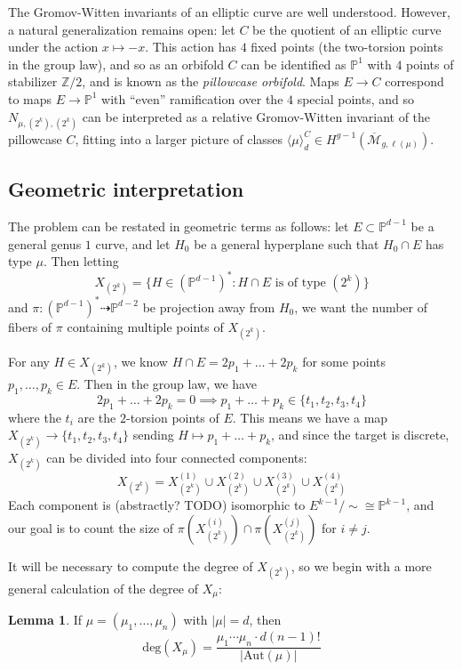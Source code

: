 \documentclass[11pt]{article}           %
\newcommand{\Z}{\ensuremath{\mathbb{Z}}}
\renewcommand{\P}{\mathbb P}
\theoremstyle{definition}
\newtheorem{lem}{Lemma}[section]
\begin{document}
The Gromov-Witten invariants of an elliptic curve are well understood. However, a natural generalization
remains open: let $C$ be the quotient of an elliptic curve under the action $x\mapsto -x$.
This action has $4$ fixed points (the two-torsion points in the group law), and so as an orbifold
$C$ can be identified as $\P^1$ with $4$ points of stabilizer $\Z/2$, and is known as the
{\it pillowcase orbifold}. Maps $E\to C$ correspond to maps $E\to\P^1$ with ``even'' ramification over
the $4$ special points, and so $N_{\mu,(2^k),(2^k)}$ can be interpreted as a relative Gromov-Witten
invariant of the pillowcase $C$, fitting into a larger picture of classes $\langle \mu\rangle_d^{C}\in H^{g-1}(\overline{\mathcal M}_{g,\ell(\mu)})$.

\subsection{Geometric interpretation}

The problem can be restated in geometric terms as follows: let $E\subset \P^{d-1}$ be a general genus $1$ curve,
and let $H_0$ be a general hyperplane such that $H_0\cap E$ has type $\mu$. Then letting \[X_{(2^k)}=\{H\in(\P^{d-1})^*:H\cap E\text{ is of type }(2^k)\}\]
and $\pi:(\P^{d-1})^*\dashrightarrow \P^{d-2}$ be projection away from $H_0$, we want the number of fibers of $\pi$
containing multiple points of $X_{(2^k)}$.

For any $H\in X_{(2^k)}$, we know $H\cap E=2p_1+\dots+2p_k$ for some points $p_1,\dots,p_k\in E$. Then in the group law, we have
\[
2p_1+\dots+2p_k=0\implies p_1+\dots+p_k\in\{t_1,t_2,t_3,t_4\}
\]
where the $t_i$ are the $2$-torsion points of $E$. This means we have a map $X_{(2^k)}\to\{t_1,t_2,t_3,t_4\}$ sending $H\mapsto p_1+\dots+p_k$, and since the target is discrete, $X_{(2^k)}$ can be divided into four connected components:
\[
X_{(2^k)}=X_{(2^k)}^{(1)}\cup X_{(2^k)}^{(2)}\cup X_{(2^k)}^{(3)}\cup X_{(2^k)}^{(4)}
\]
Each component is (abstractly? TODO) isomorphic to $E^{k-1}/\sim\cong \P^{k-1}$,
and our goal is to count the size of $\pi(X_{(2^k)}^{(i)})\cap \pi(X_{(2^k)}^{(j)})$
for $i\neq j$.

It will be necessary to compute the degree of $X_{(2^k)}$, so we begin with a more general calculation of the degree of $X_{\mu}$:

\begin{lem}
  If $\mu=(\mu_1,\dots,\mu_n)$ with $|\mu|=d$, then
  \[
  \text{deg}(X_{\mu})=\frac{\mu_1\cdots\mu_n\cdot d(n-1)!}{|\text{Aut}(\mu)|}
  \]
\end{lem}
\end{document}

